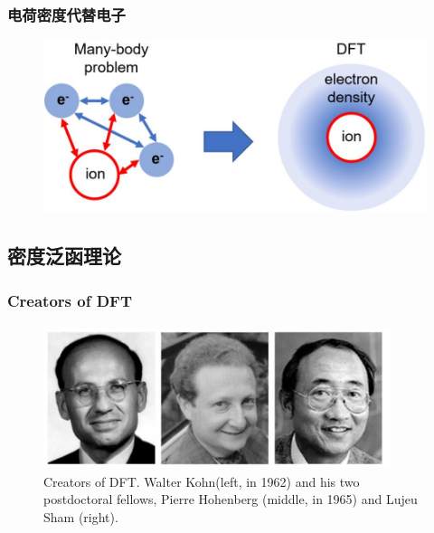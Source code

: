 \frame
{
	\frametitle{电荷密度代替电子}
\begin{figure}[h!]
\centering
\vspace{3.5pt}
\includegraphics[height=0.45\textwidth,width=1.0\textwidth,viewport=0 0 950 440,clip]{Figures/Schematic-illustration-of-transforming-many_electron-system-to-electron-density.png}
\caption{\fontsize{6.0pt}{4.5pt}}
\label{Density-Particle}
\end{figure}
}

\subsection{密度泛函理论}       %
\frame
{
	\frametitle{\rm{Creators of DFT}}
\begin{figure}[h!]
\vskip 10pt
\centering
\includegraphics[height=1.65in,width=4.0in,viewport=0 0 1562 610,clip]{Figures/Creators_of_DFT.png}
\caption{\tiny \textrm{Creators of DFT. Walter Kohn(left, in 1962) and his two postdoctoral fellows, Pierre Hohenberg (middle, in 1965) and Lujeu Sham (right).}}%
\label{Creator_of_DFT}
\end{figure}
}

